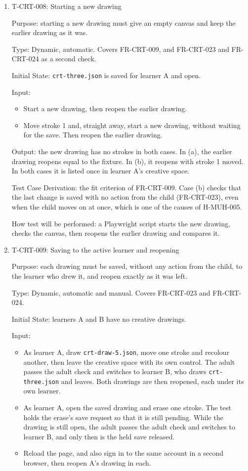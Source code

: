 \documentclass[12pt, titlepage]{article}
\newcommand{\testitem}[1]{\item #1\par\nopagebreak}
\begin{document}
\begin{enumerate}
How test will be performed: a Playwright script saves each $S_k$ after its
change, then compares the drawing with the expected $S_k$ after every undo
and redo.

\testitem{T-CRT-008: Starting a new drawing}

Purpose: starting a new drawing must give an empty canvas and keep the
earlier drawing as it was.

Type: Dynamic, automatic. Covers FR-CRT-009, and FR-CRT-023 and FR-CRT-024 as
a second check.

Initial State: \texttt{crt-three.json} is saved for learner A and open.

Input:
\begin{itemize}
\item[(a)] Start a new drawing, then reopen the earlier drawing.
\item[(b)] Move stroke 1 and, straight away, start a new drawing, without
waiting for the save. Then reopen the earlier drawing.
\end{itemize}

Output: the new drawing has no strokes in both cases. In (a), the earlier
drawing reopens equal to the fixture. In (b), it reopens with stroke 1
moved. In both cases it is listed once in learner A's creative space.

Test Case Derivation: the fit criterion of FR-CRT-009. Case (b) checks that
the last change is saved with no action from the child (FR-CRT-023), even
when the child moves on at once, which is one of the causes of H-MUH-005.

How test will be performed: a Playwright script starts the new drawing,
checks the canvas, then reopens the earlier drawing and compares it.

\testitem{T-CRT-009: Saving to the active learner and reopening}

Purpose: each drawing must be saved, without any action from the child, to
the learner who drew it, and reopen exactly as it was left.

Type: Dynamic, automatic and manual. Covers FR-CRT-023 and FR-CRT-024.

Initial State: learners A and B have no creative drawings.

Input:
\begin{itemize}
\item[(a)] As learner A, draw \texttt{crt-draw-5.json}, move one stroke and
recolour another, then leave the creative space with its own control. The
adult passes the adult check and switches to learner B, who draws
\texttt{crt-three.json} and leaves. Both drawings are then reopened, each
under its own learner.
\item[(b)] As learner A, open the saved drawing and erase one stroke. The
test holds the erase's save request so that it is still pending. While the
drawing is still open, the adult passes the adult check and switches to
learner B, and only then is the held save released.
\item[(c)] Reload the page, and also sign in to the same account in a second
browser, then reopen A's drawing in each.
\end{itemize}


\end{enumerate}
\end{document}
